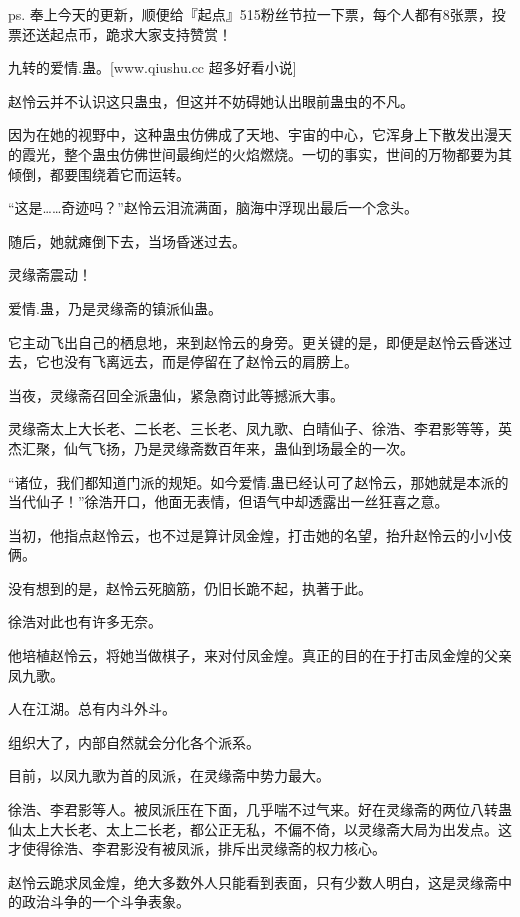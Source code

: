 
\begin{this_body}

ps. 奉上今天的更新，顺便给『起点』515粉丝节拉一下票，每个人都有8张票，投票还送起点币，跪求大家支持赞赏！

九转的爱情.蛊。[www.qiushu.cc 超多好看小说]

赵怜云并不认识这只蛊虫，但这并不妨碍她认出眼前蛊虫的不凡。

因为在她的视野中，这种蛊虫仿佛成了天地、宇宙的中心，它浑身上下散发出漫天的霞光，整个蛊虫仿佛世间最绚烂的火焰燃烧。一切的事实，世间的万物都要为其倾倒，都要围绕着它而运转。

“这是……奇迹吗？”赵怜云泪流满面，脑海中浮现出最后一个念头。

随后，她就瘫倒下去，当场昏迷过去。

灵缘斋震动！

爱情.蛊，乃是灵缘斋的镇派仙蛊。

它主动飞出自己的栖息地，来到赵怜云的身旁。更关键的是，即便是赵怜云昏迷过去，它也没有飞离远去，而是停留在了赵怜云的肩膀上。

当夜，灵缘斋召回全派蛊仙，紧急商讨此等撼派大事。

灵缘斋太上大长老、二长老、三长老、凤九歌、白晴仙子、徐浩、李君影等等，英杰汇聚，仙气飞扬，乃是灵缘斋数百年来，蛊仙到场最全的一次。

“诸位，我们都知道门派的规矩。如今爱情.蛊已经认可了赵怜云，那她就是本派的当代仙子！”徐浩开口，他面无表情，但语气中却透露出一丝狂喜之意。

当初，他指点赵怜云，也不过是算计凤金煌，打击她的名望，抬升赵怜云的小小伎俩。

没有想到的是，赵怜云死脑筋，仍旧长跪不起，执著于此。

徐浩对此也有许多无奈。

他培植赵怜云，将她当做棋子，来对付凤金煌。真正的目的在于打击凤金煌的父亲凤九歌。

人在江湖。总有内斗外斗。

组织大了，内部自然就会分化各个派系。

目前，以凤九歌为首的凤派，在灵缘斋中势力最大。

徐浩、李君影等人。被凤派压在下面，几乎喘不过气来。好在灵缘斋的两位八转蛊仙太上大长老、太上二长老，都公正无私，不偏不倚，以灵缘斋大局为出发点。这才使得徐浩、李君影没有被凤派，排斥出灵缘斋的权力核心。

赵怜云跪求凤金煌，绝大多数外人只能看到表面，只有少数人明白，这是灵缘斋中的政治斗争的一个斗争表象。


\end{this_body}
